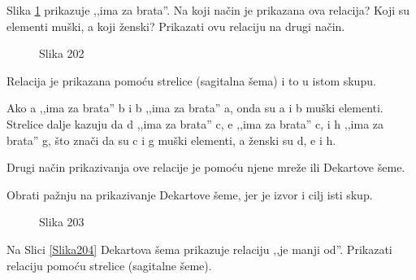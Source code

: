     \begin{zad}

        Slika \ref{Slika202} prikazuje ,,ima za brata''. Na koji na\v cin je prikazana ova relacija? Koji su elementi mu\v ski, a koji \v zenski? Prikazati ovu relaciju na drugi na\v cin.

    \end{zad}



    \begin{figure}[H] 

        \center


        \caption{Slika 202}

        \label{Slika202}

    \end{figure}



    Relacija je prikazana pomo\' cu strelice (sagitalna \v sema) i to u istom skupu.



    Ako a ,,ima za brata'' b i b ,,ima za brata'' a, onda su a i b mu\v ski elementi. Strelice dalje kazuju da d ,,ima za brata'' c, e ,,ima za brata'' c, i h ,,ima za brata'' g, \v sto zna\v ci da su c i g mu\v ski elementi, a \v zenski su d, e i h.



    Drugi na\v cin prikazivanja ove relacije je pomo\' cu njene mre\v ze  ili Dekartove \v seme.



    Obrati pa\v znju na prikazivanje Dekartove \v seme, jer je izvor i cilj isti skup.



    \begin{figure}[H] 

        \center


        \caption{Slika 203}

        \label{Slika203}

    \end{figure}



    \begin{zad}

        Na Slici \ref{Slika204} Dekartova \v sema prikazuje relaciju ,,je manji od''. Prikazati relaciju pomo\' cu strelice (sagitalne \v seme).

    \end{zad}



